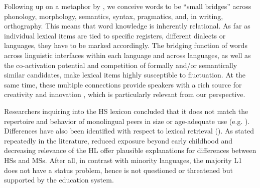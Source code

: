 \documentclass[output=paper,colorlinks,citecolor=brown]{langscibook}
\begin{document}
Following up on a metaphor by \citet{JackendoffAudring2019TextureLexicon}, we conceive words to be ``small bridges'' across phonology, morphology, semantics, syntax, pragmatics, and, in writing, orthography. This means that word knowledge is inherently relational. As far as individual lexical items are tied to specific registers, different dialects or languages, they have to be marked accordingly. The bridging function of words across linguistic interfaces within each language and across languages, as well as the co-activation potential and competition of formally and/or semantically similar candidates, make lexical items highly susceptible to fluctuation. At the same time, these multiple connections provide speakers with a rich source for creativity and innovation \citep{DeganiPriorTokowicz2011Bidirectional, PriorEtAl2017Suspectibility, RabinovitchTsvetkovWintner2018Effects}, which is  particularly relevant from our perspective.

Researchers inquiring into the HS lexicon concluded that it does not match the repertoire and behavior of monolingual peers in size or age-adequate use (e.g. \citealt{Montrul2006Competence, Polinsky2018HeritageLanguages}). Differences have also been identified with respect to lexical retrieval (\citealt{Moreno-Fernandez2007Anglicismos, Polinsky2018HeritageLanguages}). As stated repeatedly in the literature, reduced exposure beyond early childhood and decreasing relevance of the HL offer plausible explanations for differences between HSs and MSs. After all, in contrast with minority languages, the majority L1 does not have a status problem, hence is not questioned or threatened but supported by the education system. 
\largerpage
\end{document}
